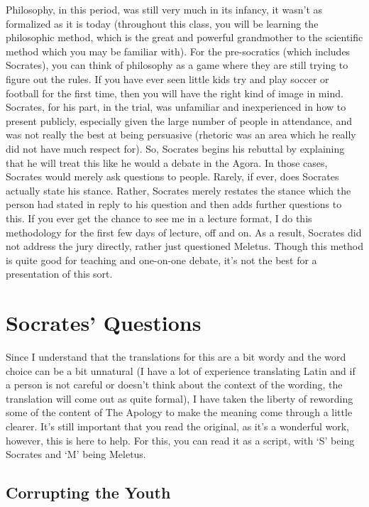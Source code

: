 Philosophy, in this period, was still very much in its infancy, it wasn't as formalized as it is today (throughout this class, you will be learning the philosophic method, which is the great and powerful grandmother to the scientific method which you may be familiar with). For the pre-socratics (which includes Socrates), you can think of philosophy as a game where they are still trying to figure out the rules. If you have ever seen little kids try and play soccer or football for the first time, then you will have the right kind of image in mind.  Socrates, for his part, in the trial, was unfamiliar and inexperienced in how to present publicly, especially given the large number of people in attendance, and was not really the best at being persuasive (rhetoric was an area which he really did not have much respect for). So, Socrates begins his rebuttal by explaining that he will treat this like he would a debate in the Agora. In those cases, Socrates would merely ask questions to people. Rarely, if ever, does Socrates actually state his stance. Rather, Socrates merely restates the stance which the person had stated in reply to his question and then adds further questions to this. If you ever get the chance to see me in a lecture format, I do this methodology for the first few days of lecture, off and on. As a result, Socrates did not address the jury directly, rather just questioned Meletus. Though this method is quite good for teaching and one-on-one debate, it's not the best for a presentation of this sort. 
\section{Socrates' Questions}

Since I understand that the translations for this are a bit wordy and the word choice can be a bit unnatural (I have a lot of experience translating Latin and if a person is not careful or doesn't think about the context of the wording, the translation will come out as quite formal), I have taken the liberty of rewording some of the content of The Apology to make the meaning come through a little clearer. It's still important that you read the original, as it's a wonderful work, however, this is here to help. For this, you can read it as a script, with `S' being Socrates and `M' being Meletus.
\subsection{Corrupting the Youth}

